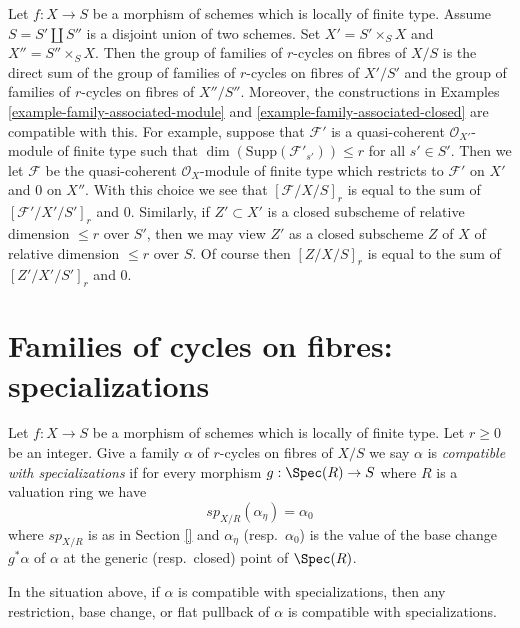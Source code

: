 \begin{remark}
\label{remark-disjoint-decomposition-base}
Let $f : X \to S$ be a morphism of schemes which is locally of
finite type. Assume $S = S' \amalg S''$ is a disjoint union of
two schemes. Set $X' = S' \times_S X$ and $X'' = S'' \times_S X$.
Then the group of families of $r$-cycles on fibres of $X/S$
is the direct sum of the group of families of $r$-cycles on fibres of $X'/S'$
and the group of families of $r$-cycles on fibres of $X''/S''$.
Moreover, the constructions in
Examples \ref{example-family-associated-module} and
\ref{example-family-associated-closed} are compatible with this.
For example, suppose that $\mathcal{F}'$ is a quasi-coherent
$\mathcal{O}_{X'}$-module of finite type such that
$\dim(\text{Supp}(\mathcal{F}'_{s'})) \leq r$ for all $s' \in S'$.
Then we let $\mathcal{F}$ be the quasi-coherent
$\mathcal{O}_X$-module of finite type which restricts to
$\mathcal{F}'$ on $X'$ and $0$ on $X''$.
With this choice we see that $[\mathcal{F}/X/S]_r$
is equal to the sum of $[\mathcal{F}'/X'/S']_r$ and $0$.
Similarly, if $Z' \subset X'$ is a closed subscheme of relative
dimension $\leq r$ over $S'$, then we may view $Z'$ as a closed subscheme
$Z$ of $X$ of relative dimension $\leq r$ over $S$. Of course
then $[Z/X/S]_r$ is equal to the sum of $[Z'/X'/S']_r$ and $0$.
\end{remark}







\section{Families of cycles on fibres: specializations}
\label{section-families-specialization}

\noindent
Let $f : X \to S$ be a morphism of schemes which is locally of finite type.
Let $r \geq 0$ be an integer. Give a family $\alpha$ of $r$-cycles on fibres
of $X/S$ we say $\alpha$ is {\it compatible with specializations} if
for every morphism $g : \Spec(R) \to S$ where $R$ is a valuation ring we have
$$
sp_{X/R}(\alpha_\eta) = \alpha_0
$$
where $sp_{X/R}$ is as in Section \ref{}
and $\alpha_\eta$ (resp.\ $\alpha_0$) is the value of the base change
$g^*\alpha$ of $\alpha$ at the generic (resp.\ closed) point of $\Spec(R)$.

\begin{lemma}
\label{lemma-families-specialization}
In the situation above, if $\alpha$ is compatible with specializations,
then any restriction, base change, or flat pullback of $\alpha$ is compatible
with specializations.
\end{lemma}

